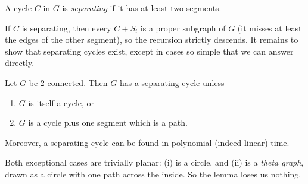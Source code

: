 \begin{definition}
A cycle $C$ in $G$ is \emph{separating} if it has at least two segments.
\end{definition}

If $C$ is separating, then every $C + S_i$ is a proper subgraph of $G$ (it
misses at least the edges of the other segment), so the recursion strictly
descends. It remains to show that separating cycles exist, except in cases so
simple that we can answer directly.

\begin{lemma}\label{lem:planar-sepcycle}
Let $G$ be $2$-connected. Then $G$ has a separating cycle unless
\begin{enumerate}[label=(\roman*),nosep]
  \item $G$ is itself a cycle, or
  \item $G$ is a cycle plus one segment which is a path.
\end{enumerate}
Moreover, a separating cycle can be found in polynomial (indeed linear) time.
\end{lemma}

Both exceptional cases are trivially planar: (i) is a circle, and (ii) is a
\emph{theta graph}, drawn as a circle with one path across the inside. So the
lemma loses us nothing.

